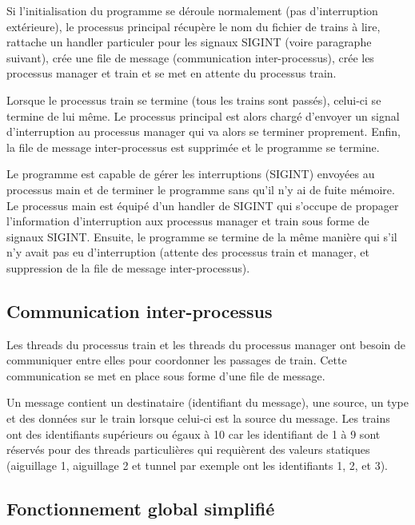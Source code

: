 \documentclass[a4paper,12pt]{article}
\begin{document}
Si l'initialisation du programme se déroule normalement (pas d'interruption extérieure), le processus principal récupère le nom du fichier de trains à lire, rattache un handler particuler pour les signaux SIGINT (voire paragraphe suivant), crée une file de message (communication inter-processus), crée les processus manager et train et se met en attente du processus train.

Lorsque le processus train se termine (tous les trains sont passés), celui-ci se termine de lui même. Le processus principal est alors chargé d'envoyer un signal d'interruption au processus manager qui va alors se terminer proprement. Enfin, la file de message inter-processus est supprimée et le programme se termine.

Le programme est capable de gérer les interruptions (SIGINT) envoyées au processus main et de terminer le programme sans qu'il n'y ai de fuite mémoire. Le processus main est équipé d'un handler de SIGINT qui s'occupe de propager l'information d'interruption aux processus manager et train sous forme de signaux SIGINT. Ensuite, le programme se termine de la même manière qui s'il n'y avait pas eu d'interruption (attente des processus train et manager, et suppression de la file de message inter-processus).

\subsection{Communication inter-processus}

Les threads du processus train et les threads du processus manager ont besoin de communiquer entre elles pour coordonner les passages de train. Cette communication se met en place sous forme d'une file de message.

Un message contient un destinataire (identifiant du message), une source, un type et des données sur le train lorsque celui-ci est la source du message. Les trains ont des identifiants supérieurs ou égaux à 10 car les identifiant de 1 à 9 sont réservés pour des threads particulières qui requièrent des valeurs statiques (aiguillage 1, aiguillage 2 et tunnel par exemple ont les identifiants 1, 2, et 3).

\subsection{Fonctionnement global simplifié}
\end{document}
